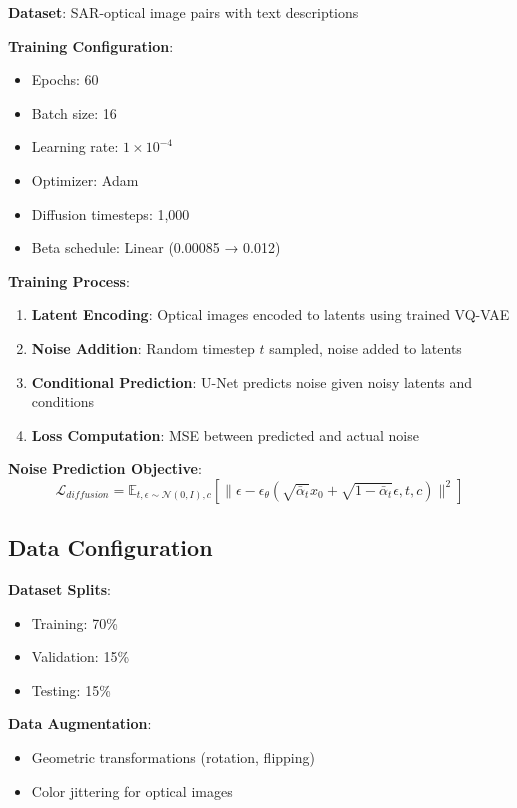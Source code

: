 \textbf{Dataset}: SAR-optical image pairs with text descriptions

\textbf{Training Configuration}:
\begin{itemize}
    \item Epochs: 60
    \item Batch size: 16
    \item Learning rate: $1 \times 10^{-4}$
    \item Optimizer: Adam
    \item Diffusion timesteps: 1,000
    \item Beta schedule: Linear (0.00085 → 0.012)
\end{itemize}

\textbf{Training Process}:
\begin{enumerate}
    \item \textbf{Latent Encoding}: Optical images encoded to latents using trained VQ-VAE
    \item \textbf{Noise Addition}: Random timestep $t$ sampled, noise added to latents
    \item \textbf{Conditional Prediction}: U-Net predicts noise given noisy latents and conditions
    \item \textbf{Loss Computation}: MSE between predicted and actual noise
\end{enumerate}

\textbf{Noise Prediction Objective}:
\begin{equation}
\mathcal{L}_{diffusion} = \mathbb{E}_{t,\epsilon \sim \mathcal{N}(0,I),c} \left[ \|\epsilon - \epsilon_\theta(\sqrt{\bar{\alpha}_t}x_0 + \sqrt{1-\bar{\alpha}_t}\epsilon, t, c)\|^2 \right]
\end{equation}

\subsection{Data Configuration}

\textbf{Dataset Splits}:
\begin{itemize}
    \item Training: 70\%
    \item Validation: 15\%
    \item Testing: 15\%
\end{itemize}

\textbf{Data Augmentation}:
\begin{itemize}
    \item Geometric transformations (rotation, flipping)
    \item Color jittering for optical images
\end{itemize}


